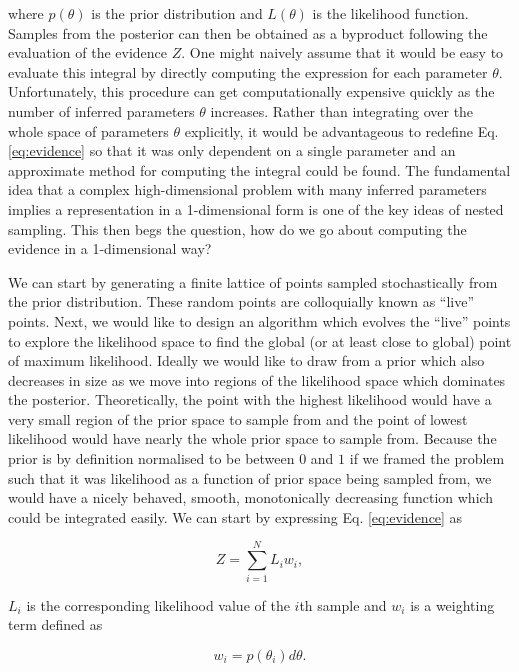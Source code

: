 where $p(\theta)$ is the prior distribution and $L(\theta)$ is the likelihood function. Samples from the posterior can then be obtained as a byproduct following the evaluation of the evidence $Z$. One might naively assume that it would be easy to evaluate this integral by directly computing the expression for each parameter $\theta$. Unfortunately, this procedure can get computationally expensive quickly as the number of inferred parameters $\theta$ increases. Rather than integrating over the whole space of parameters $\theta$ explicitly, it would be advantageous to redefine Eq. \ref{eq:evidence} so that it was only dependent on a single parameter and an approximate method for computing the integral could be found. The fundamental idea that a complex high-dimensional problem with many inferred parameters implies a representation in a 1-dimensional form is one of the key ideas of nested sampling. This then begs the question, how do we go about computing the evidence in a 1-dimensional way?

We can start by generating a finite lattice of points sampled stochastically from the prior distribution. These random points are colloquially known as ``live'' points. Next, we would like to design an algorithm which evolves the ``live'' points to explore the likelihood space to find the global (or at least close to global) point of maximum likelihood. Ideally we would like to draw from a prior which also decreases in size as we move into regions of the likelihood space which dominates the posterior. Theoretically, the point with the highest likelihood would have a very small region of the prior space to sample from and the point of lowest likelihood would have nearly the whole prior space to sample from. Because the prior is by definition normalised to be between $0$ and $1$ if we framed the problem such that it was likelihood as a function of prior space being sampled from, we would have a nicely behaved, smooth, monotonically decreasing function which could be integrated easily. We can start by expressing Eq. \ref{eq:evidence} as 

\begin{equation}
    Z = \sum_{i=1}^{N} L_i w_i,
\end{equation}

$L_i$ is the corresponding likelihood value of the $i$th sample and $w_i$ is a weighting term defined as

\begin{equation}
    w_i = p(\theta_i) d\theta.
\end{equation}

